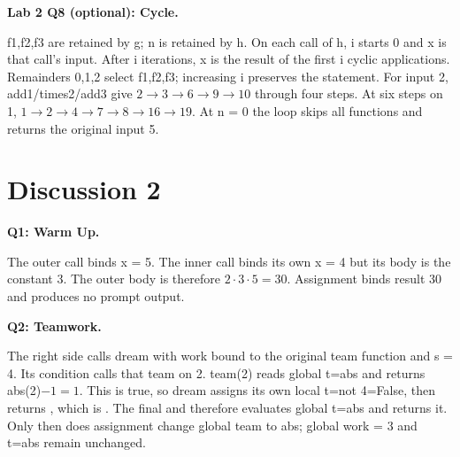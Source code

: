 \documentclass[10pt]{scrartcl}
\begin{document}
\begin{prob}
\textbf{Lab 2 Q8 (optional): Cycle.} 
\begin{steps}
\ii f1,f2,f3 are retained by g; n is retained by h. On each call of h, i starts 0 and x is that call's input.
\ii After i iterations, x is the result of the first i cyclic applications. Remainders 0,1,2 select f1,f2,f3; increasing i preserves the statement.
\ii For input 2, add1/times2/add3 give $2\to3\to6\to9\to10$ through four steps. At six steps on 1, $1\to2\to4\to7\to8\to16\to19$. At n = 0 the loop skips all functions and returns the original input 5.
\end{steps}
\end{prob}

\section{Discussion 2}
\begin{prob}
\textbf{Q1: Warm Up.} 
\begin{steps}
\ii The outer call binds x = 5. The inner call binds its own x = 4 but its body is the constant 3.
\ii The outer body is therefore $2\cdot3\cdot5=30$. Assignment binds result 30 and produces no prompt output.
\end{steps}
\end{prob}
\begin{prob}
\textbf{Q2: Teamwork.} 
\begin{steps}
\ii The right side calls dream with work bound to the original team function and s = 4. Its condition calls that team on 2.
\ii team(2) reads global t=abs and returns abs(2)$-1=1$. This is true, so dream assigns its own local t=not 4=False, then returns , which is .
\ii The final and therefore evaluates global t=abs and returns it. Only then does assignment change global team to abs; global work = 3 and t=abs remain unchanged.
\end{steps}
\begin{fig}
\end{fig}
\end{prob}
\end{document}
